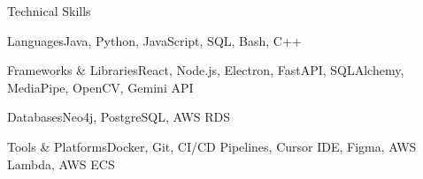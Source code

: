 \documentclass[
	11pt
]{../resume}
\begin{document}
	\begin{rSection}{T}{echnical Skills}
		\begin{rSet}{Languages}{Java, Python, JavaScript, SQL, Bash, C++}
		\end{rSet}
		\begin{rSet}{Frameworks \& Libraries}{React, Node.js, Electron, FastAPI, SQLAlchemy, MediaPipe, OpenCV, Gemini API}
		\end{rSet}
		\begin{rSet}{Databases}{Neo4j, PostgreSQL, AWS RDS}
		\end{rSet}
		\begin{rSet}{Tools \& Platforms}{Docker, Git, CI/CD Pipelines, Cursor IDE, Figma, AWS Lambda, AWS ECS}
		\end{rSet}
	\end{rSection}
\end{document}
